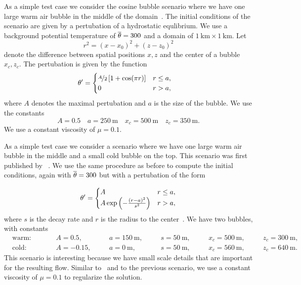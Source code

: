 As a simple test case we consider the cosine bubble scenario where we have one large warm air bubble in the middle of the domain~\cite{giraldo2008study}.
The initial conditions of the scenario are given by a pertubation of a hydrostatic equlibrium.
We use a background potential temperature of $\overline{\theta} = 300$ and a domain of $\SI{1}{\km} \times \SI{1}{\km}$.
Let
\begin{equation}
  \label{eq:radius}
  r^2 = (x - x_0)^2 + (z - z_0)^2
\end{equation}
denote the difference between spatial positions $x,z$ and the center of a bubble $x_c, z_c$.
The pertubation is given by the function
\begin{align}
  \label{eq:cos-pertubation}
  \theta' &= \begin{cases}
    \nicefrac{A}{2} \left[ 1 + \cos(\pi r) \right] & r \leq a, \\
    0 & r > a,
    \end{cases}
\end{align}
where $A$ denotes the maximal pertubation and $a$ is the size of the bubble.
We use the constants
\begin{equation}\label{eq:cosine-bubble}
  A = 0.5 \quad a = \SI{250}{\m} \quad x_c = \SI{500}{\m} \quad z_c = \SI{350}{\m}.
\end{equation}
We use a constant viscosity of $\mu = 0.1$.

As a simple test case we consider a scenario where we have one large warm air bubble in the middle and a small cold bubble on the top.
This scenario was first published by \citeauthor{robert1993bubble}~\cite{robert1993bubble}.
We use the same procedure as before to compute the initial conditions, again with $\overline{\theta} = 300$ but with a pertubation of the form

\begin{equation}
  \label{eq:bubbles-pertubation}
  \theta' =
  \begin{cases}
    A & r \leq a, \\
    A \exp \left( - \frac{(r-a)^2}{s^2} \right) & r > a,
    \end{cases}
\end{equation}
where $s$ is the decay rate and $r$  is the radius to the center~.
We have two bubbles, with constants
\begin{equation}
  \label{eq:bubbles-values}
\begin{alignedat}{6}
  & \text{warm:} \qquad && A = 0.5, \quad&& a = \SI{150}{\m}, \quad&& s = \SI{50}{\m}, \quad&& x_c = \SI{500}{\m,} \quad&& z_c = \SI{300}{\m},\\
  & \text{cold:} \qquad && A = -0.15, \quad&& a = \SI{0}{\m}, \quad&& s = \SI{50}{\m}, \quad&& x_c = \SI{560}{\m}, \quad&& z_c = \SI{640}{\m}.
  \end{alignedat}
\end{equation}
This scenario is interesting because we have small scale details that are important for the resulting flow.
Similar to~\cite{muller2010adaptive} and to the previous scenario, we use a constant viscosity of $\mu = 0.1$ to regularize the solution.

